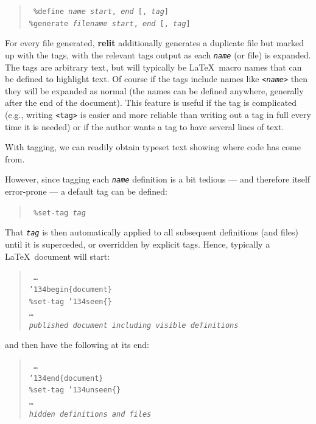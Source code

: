 \documentclass[12pt]{article}
\def\name#1{\textbf{#1}}
\begin{document}
\begin{verse}\tt
\%{}define \emph{name} \emph{start}, \emph{end} [, \emph{tag}] \\
\%{}generate \emph{filename} \emph{start}, \emph{end} [, \emph{tag}]
\end{verse} 

For every file generated, \name{relit} additionally generates a duplicate file but marked up with the tags, with the relevant tags output as each \texttt{\emph{name}} (or file) is expanded. The tags are arbitrary text, but will typically be \LaTeX\ macro names that can be defined to highlight text. Of course if the tags include names like \texttt{<\emph{name}>} then they will be expanded as normal (the names can be defined anywhere, generally after the end of the document). This feature is useful if the tag is complicated (e.g., writing \texttt{<tag>} is easier and more reliable than writing out a tag in full every time it is needed) or if the author wants a tag to have several lines of text.

With tagging, we can readily obtain typeset text showing where code has come from. 

However, since tagging each \texttt{\emph{name}} definition is a bit tedious --- and therefore itself error-prone --- a default tag can be defined:

\begin{verse}\tt
\%{}set-tag \emph{tag} \\
\end{verse}

That \texttt{\emph{tag}} is then automatically applied to all subsequent definitions (and files) until it is superceded, or overridden by explicit tags. Hence, typically a \LaTeX\ document will start:

\begin{verse}\tt
\ldots \\
\char'134begin\{document\}\\
\%{}set-tag \char'134seen\{\} \\
\ldots \\
\emph{published document including visible definitions}
\end{verse}

and then have the following at its end:

\begin{verse}\tt
\ldots\\
\char'134end\{document\} \\
\%{}set-tag \char'134unseen\{\} \\
\ldots\\
\emph{hidden definitions and files}
\end{verse}
\end{document}
